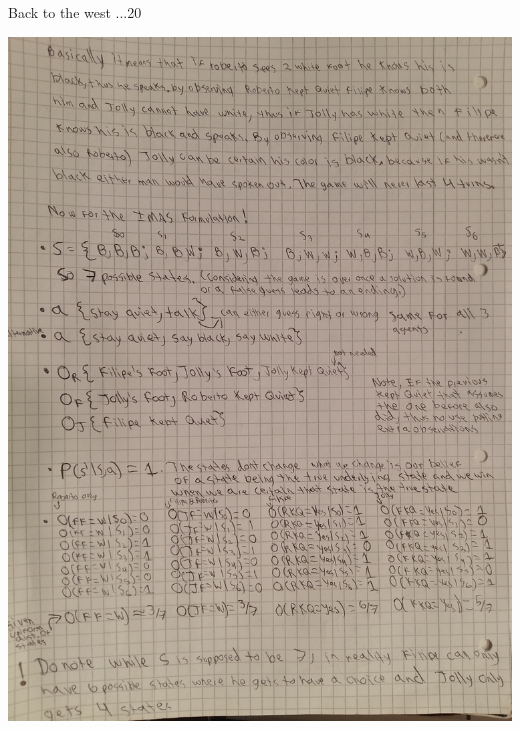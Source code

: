 \begin{questions}
\begin{question}{Back to the west ...}{20}
\begin{answer}
	\includegraphics[scale=0.2]{p2.jpg}
		\newpage


\end{answer}
\end{question}
\end{questions}
